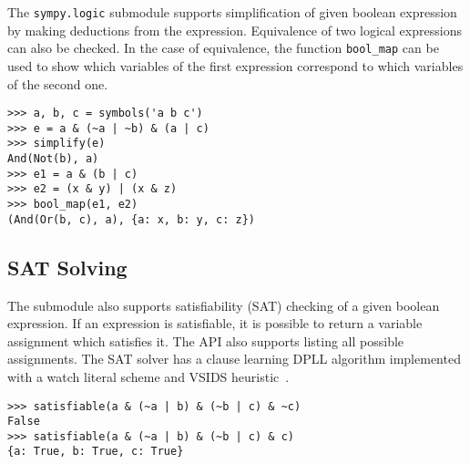 The \texttt{sympy.logic} submodule supports simplification of given boolean expression by making
deductions from the expression. Equivalence of two logical expressions can also
be checked. In the case of equivalence, the function \texttt{bool\_map}
can be used to show which variables of the first expression correspond
to which variables of the second one.

\begin{verbatim}
>>> a, b, c = symbols('a b c')
>>> e = a & (~a | ~b) & (a | c)
>>> simplify(e)
And(Not(b), a)
>>> e1 = a & (b | c)
>>> e2 = (x & y) | (x & z)
>>> bool_map(e1, e2)
(And(Or(b, c), a), {a: x, b: y, c: z})
\end{verbatim}

\subsection{SAT Solving}

The submodule also supports satisfiability (SAT) checking of a given boolean
expression. If an expression is satisfiable, it is possible to return
a variable assignment which satisfies it. The API also supports
listing all possible assignments.
The SAT solver has a clause learning DPLL algorithm implemented with a watch
literal scheme and VSIDS heuristic~\cite{moskewicz2008method}.

\begin{verbatim}
>>> satisfiable(a & (~a | b) & (~b | c) & ~c)
False
>>> satisfiable(a & (~a | b) & (~b | c) & c)
{a: True, b: True, c: True}
\end{verbatim}
